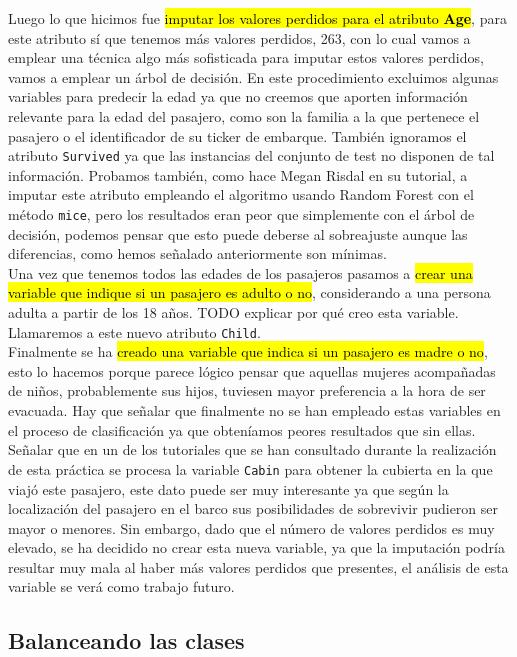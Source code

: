 \documentclass[10pt,a4paper]{article}
\newcommand{\emp}[1]{\sethlcolor{light-yellow}\hl{#1}} %
\newcommand{\code}[1]{\textcolor{rblue}{\texttt{#1}}} %
\begin{document}
Luego lo que hicimos fue \emp{imputar los valores perdidos para el atributo \textbf{Age}}, para este atributo sí que tenemos más valores perdidos, 263, con lo cual vamos a emplear una técnica algo más sofisticada para imputar estos valores perdidos, vamos a emplear un árbol de decisión. En este procedimiento excluimos algunas variables para predecir la edad ya que no creemos que aporten información relevante para la edad del pasajero, como son la familia a la que pertenece el pasajero o el identificador de su ticker de embarque. También ignoramos el atributo \code{Survived} ya que las instancias del conjunto de test no disponen de tal información. Probamos también, como hace Megan Risdal en su tutorial, a imputar este atributo empleando el algoritmo usando Random Forest con el método \code{mice}, pero los resultados eran peor que simplemente con el árbol de decisión, podemos pensar que esto puede deberse al sobreajuste aunque las diferencias, como hemos señalado anteriormente son mínimas.\\

Una vez que tenemos todos las edades de los pasajeros pasamos a \emp{crear una variable que indique si un pasajero es adulto o no}, considerando a una persona adulta a partir de los 18 años. TODO explicar por qué creo esta variable. Llamaremos a este nuevo atributo \code{Child}.\\

Finalmente se ha \emp{creado una variable que indica si un pasajero es madre o no}, esto lo hacemos porque parece lógico pensar que aquellas mujeres acompañadas de niños, probablemente sus hijos, tuviesen mayor preferencia a la hora de ser evacuada. Hay que señalar que finalmente no se han empleado estas variables en el proceso de clasificación ya que obteníamos peores resultados que sin ellas.\\

Señalar que en un de los tutoriales que se han consultado durante la realización de esta práctica se procesa la variable \code{Cabin} para obtener la cubierta en la que viajó este pasajero, este dato puede ser muy interesante ya que según la localización del pasajero en el barco sus posibilidades de sobrevivir pudieron ser mayor o menores. Sin embargo, dado que el número de valores perdidos es muy elevado, se ha decidido no crear esta nueva variable, ya que la imputación podría resultar muy mala al haber más valores perdidos que presentes, el análisis de esta variable se verá como trabajo futuro.

\subsection{Balanceando las clases}
\end{document}
